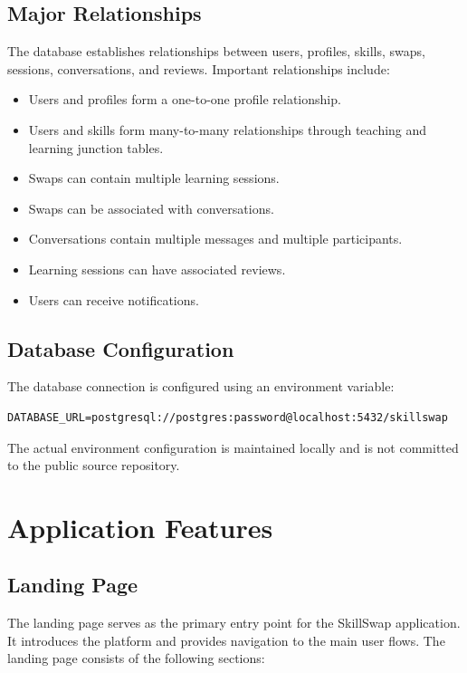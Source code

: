 \documentclass[12pt,a4paper]{report}
\begin{document}
\section{Major Relationships}
The database establishes relationships between users, profiles, skills, swaps,
sessions, conversations, and reviews.  Important relationships include:

\begin{itemize}[noitemsep]
  \item Users and profiles form a one-to-one profile relationship.
  \item Users and skills form many-to-many relationships through teaching and
        learning junction tables.
  \item Swaps can contain multiple learning sessions.
  \item Swaps can be associated with conversations.
  \item Conversations contain multiple messages and multiple participants.
  \item Learning sessions can have associated reviews.
  \item Users can receive notifications.
\end{itemize}

\section{Database Configuration}
The database connection is configured using an environment variable:

\begin{lstlisting}
DATABASE_URL=postgresql://postgres:password@localhost:5432/skillswap
\end{lstlisting}

The actual environment configuration is maintained locally and is not committed
to the public source repository.

\chapter{Application Features}

\section{Landing Page}
The landing page serves as the primary entry point for the SkillSwap
application.  It introduces the platform and provides navigation to the main
user flows.  The landing page consists of the following sections:
\end{document}
